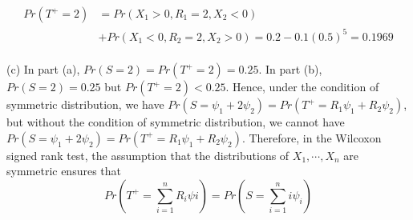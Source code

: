 \documentclass[12pt,a4paper]{article}
\begin{document}
\begin{align*}
Pr(T^{+}=2)&=Pr(X_{1}>0,R_{1}=2,X_{2}<0)\\
&+Pr(X_{1}<0,R_{2}=2,X_{2}>0)=0.2-0.1(0.5)^{5}=0.1969
\end{align*}
~\\
(c) In part (a),  $Pr(S=2)=Pr(T^{+}=2)=0.25$. In part (b), $Pr(S=2)=0.25$ but $Pr(T^{+}=2)<0.25$. Hence, under the condition of symmetric distribution, we have $Pr(S=\psi_{1}+2\psi_{2})=Pr(T^{+}=R_{1}\psi_{1}+R_{2}\psi_{2})$, but without the condition of symmetric distribution, we cannot have 
$Pr(S=\psi_{1}+2\psi_{2})=Pr(T^{+}=R_{1}\psi_{1}+R_{2}\psi_{2})$. Therefore, in the Wilcoxon signed rank test, the assumption that the distributions of $X_{1},\cdots,X_{n}$ are symmetric ensures that
$$Pr(T^{+}=\sum_{i=1}^{n}R_{i}\psi{i})=Pr(S=\sum_{i=1}^{n}i\psi_{i})$$
\end{document}
